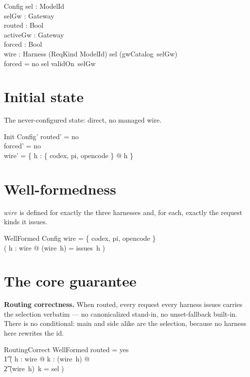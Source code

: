 \documentclass{article}
\begin{document}
\begin{schema}{Config}
  sel : ModelId \\
  selGw : Gateway \\
  routed : Bool \\
  activeGw : Gateway \\
  forced : Bool \\
  wire : Harness \pfun (ReqKind \pfun ModelId)
\where
  sel \in \dom (gwCatalog~selGw) \\
  forced = no \implies sel \in validOn~selGw
\end{schema}

\section{Initial state}

The never-configured state: direct, no managed wire.

\begin{schema}{Init}
  Config'
\where
  routed' = no \\
  forced' = no \\
  wire' = \{ h : \{ codex, pi, opencode \} @ h \mapsto \emptyset \}
\end{schema}

\section{Well-formedness}

$wire$ is defined for exactly the three harnesses and, for each, exactly the
request kinds it issues.

\begin{schema}{WellFormed}
  Config
\where
  \dom wire = \{ codex, pi, opencode \} \\
  ( \forall h : \dom wire @ \dom (wire~h) = issues~h )
\end{schema}

\section{The core guarantee}

\textbf{Routing correctness.} When routed, every request every harness issues
carries the selection verbatim --- no canonicalized stand-in, no unset-fallback
built-in. There is no conditional: main and side alike are the selection,
because no harness here rewrites the id.

\begin{schema}{RoutingCorrect}
  WellFormed
\where
  routed = yes \implies \\
  \t1 ( \forall h : \dom wire @ \forall k : \dom (wire~h) @ \\
  \t2   (wire~h)~k = sel )
\end{schema}
\end{document}
